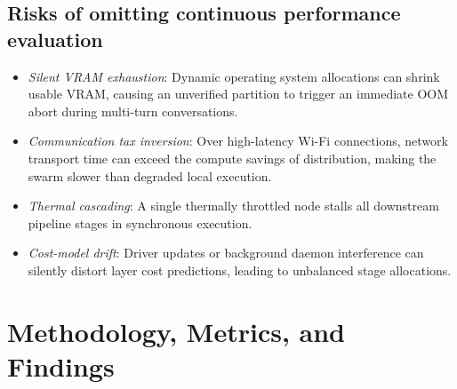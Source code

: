 \documentclass[10pt,a4paper]{article}
\begin{document}
\subsection{Risks of omitting continuous performance evaluation}
\begin{itemize}[leftmargin=*]
\item \emph{Silent VRAM exhaustion}: Dynamic operating system allocations can shrink usable VRAM, causing an unverified partition to trigger an immediate OOM abort during multi-turn conversations.
\item \emph{Communication tax inversion}: Over high-latency Wi-Fi connections, network transport time can exceed the compute savings of distribution, making the swarm slower than degraded local execution.
\item \emph{Thermal cascading}: A single thermally throttled node stalls all downstream pipeline stages in synchronous execution.
\item \emph{Cost-model drift}: Driver updates or background daemon interference can silently distort layer cost predictions, leading to unbalanced stage allocations.
\end{itemize}

\section{Methodology, Metrics, and Findings}
\end{document}
